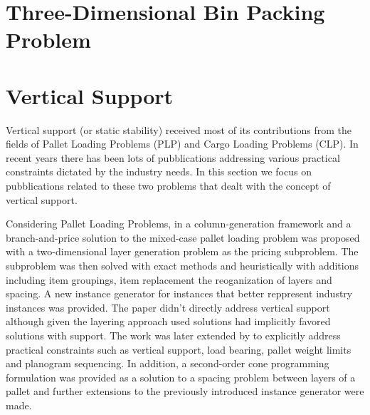 \section{Three-Dimensional Bin Packing Problem}

\citep{martello2000three}

\citep{faroe2003guided}

\citep{lodi2002heuristic}

\citep{crainic2008extreme}

\citep{crainic2009ts2pack}

\citep{parreno2010hybrid}

\citep{WU2010347}

\citep{ZHU2012452}

\citep{hifi2014hybrid}

\citep{gonccalves2013biased}

\citep{zudio2018brkga}

\section{Vertical Support}
Vertical support (or static stability) received most of its contributions from the fields of Pallet Loading Problems (PLP) and Cargo Loading Problems (CLP).
In recent years there has been lots of pubblications addressing various practical constraints dictated by the industry needs.
In this section we focus on pubblications related to these two problems that dealt with the concept of vertical support.

Considering Pallet Loading Problems, in \citep{elhedhli2019three} a column-generation framework and a branch-and-price solution to the mixed-case pallet loading problem was proposed with a two-dimensional layer generation problem as the pricing subproblem.
The subproblem was then solved with exact methods and heuristically with additions including item groupings, item replacement the reoganization of layers and spacing.
A new instance generator for instances that better reppresent industry instances was provided. The paper didn't directly address vertical support although given the layering approach used solutions had implicitly favored solutions with support.
The work was later extended by \citep{GZARA20201062} to explicitly address practical constraints such as vertical support, load bearing, pallet weight limits and planogram sequencing.  
In addition, a second-order cone programming formulation was provided as a solution to a spacing problem between layers of a pallet and further extensions to the previously introduced instance generator were made.

